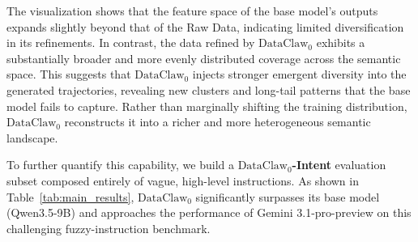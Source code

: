 The visualization shows that the feature space of the base model’s outputs expands slightly beyond that of the Raw Data, 
indicating limited diversification in its refinements. 
In contrast, the data refined by $\text{DataClaw}_0$ exhibits a substantially broader and more evenly distributed coverage across the semantic space. 
This suggests that $\text{DataClaw}_0$ injects stronger emergent diversity into the generated trajectories, 
revealing new clusters and long-tail patterns that the base model fails to capture. 
Rather than marginally shifting the training distribution, 
$\text{DataClaw}_0$ reconstructs it into a richer and more heterogeneous semantic landscape.

To further quantify this capability, we build a \textbf{$\text{DataClaw}_0$-Intent} evaluation subset composed entirely of vague, high-level instructions. 
As shown in Table~\ref{tab:main_results}, $\text{DataClaw}_0$ significantly surpasses its base model (Qwen3.5-9B) 
and approaches the performance of Gemini 3.1-pro-preview on this challenging fuzzy-instruction benchmark.





